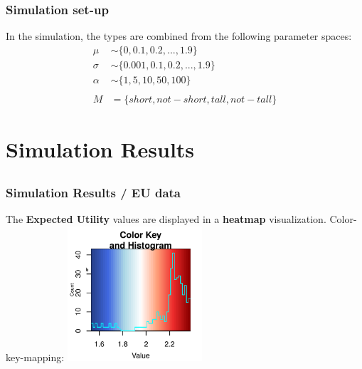 \documentclass[8pt]{beamer}
\begin{document}
\begin{frame}
\frametitle{Simulation set-up}
In the simulation, the types are combined from the following parameter spaces:
\vskip5mm
\begin{align*}
\mu &\sim \{ 0, 0.1, 0.2, ... , 1.9 \} \\
\sigma &\sim \{ 0.001, 0.1, 0.2, ... , 1.9 \} \\
\alpha &\sim \{ 1, 5, 10, 50, 100 \}\\
\\
M &= \{ short, not-short, tall, not-tall\}
\end{align*}
\end{frame}

\section{Simulation Results}
\subsection*{}
\begin{frame}
\frametitle{Simulation Results / EU data}
\vskip5mm
The \textbf{Expected Utility} values are displayed in a \textbf{heatmap} visualization.
Color-key-mapping:
\vskip5mm
\hskip2cm
\includegraphics[width=5cm]{bilder/color-key-mapping.png}

\end{frame}
\end{document}
